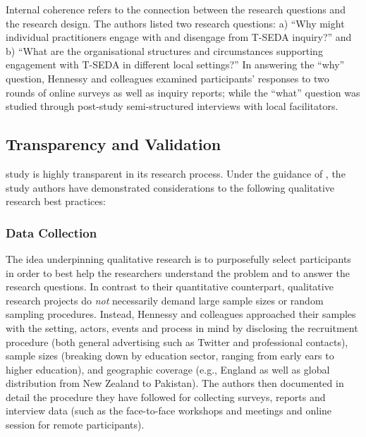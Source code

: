 \documentclass[
        a4paper, %
        12pt, %
        stu, %
        donotrepeattitle, %
        floatsintext, %
        biblatex, %
        twoside, %
        colorlinks=true,        %
        linkcolor=red,          %
        anchorcolor=red,      %
        citecolor=blue,         %
        urlcolor=blue,          %
        bookmarks=true,         %
        bookmarksopen=false,    %
        bookmarksnumbered=true,  %
        dvipsnames
]{apa7}
\begin{document}
Internal coherence refers to the connection between the research questions and the research design. The authors listed two research questions: a) ``Why might individual practitioners engage with and disengage from T-SEDA inquiry?'' and b) ``What are the organisational structures and circumstances supporting engagement with T-SEDA in different local settings?'' In answering the ``why'' question, Hennessy and colleagues examined participants' responses to two rounds of online surveys as well as inquiry reports; while the ``what'' question was studied through post-study semi-structured interviews with local facilitators.

\subsection{Transparency and Validation} %

 study is highly transparent in its research process. Under the guidance of \textcite[][pp. 185--198]{creswell:2018}, the study authors have demonstrated considerations to the following qualitative research best practices:

\subsubsection{Data Collection}

The idea underpinning qualitative research is to purposefully select participants in order to best help the researchers understand the problem and to answer the research questions. In contrast to their quantitative counterpart, qualitative research projects do \emph{not} necessarily demand large sample sizes or random sampling procedures. Instead, Hennessy and colleagues approached their samples with the setting, actors, events and process in mind by disclosing the recruitment procedure (both general advertising such as Twitter and professional contacts), sample sizes (breaking down by education sector, ranging from early ears to higher education), and geographic coverage (e.g., England as well as global distribution from New Zealand to Pakistan). The authors then documented in detail the procedure they have followed for collecting surveys, reports and interview data (such as the face-to-face workshops and meetings and online session for remote participants).
\end{document}
